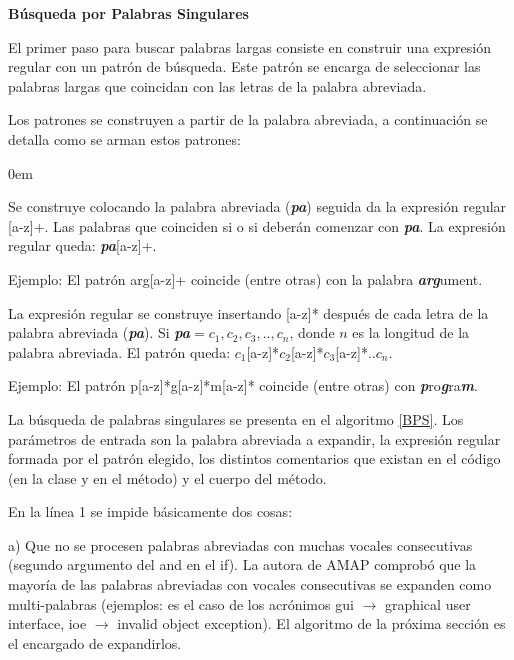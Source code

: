 \documentclass[a4paper,12pt]{report}
\begin{document}
\noindent \textbf{Búsqueda por Palabras Singulares\\}

El primer paso para buscar palabras largas consiste en construir una expresión regular con un patrón de búsqueda.  Este patrón se encarga de seleccionar las palabras largas que coincidan con las letras de la palabra abreviada.

Los patrones se construyen a partir de la palabra abreviada, a continuación se detalla como se arman estos patrones: 

\begin{description}
\itemsep0em%
\item[Patrón prefijo:] Se construye colocando la palabra abreviada (\textit{\textbf{pa}}) seguida da la expresión regular [a-z]+. Las palabras que coinciden si o si deberán comenzar con \textit{\textbf{pa}}. La expresión regular queda: \textit{\textbf{pa}}[a-z]+.

Ejemplo: El patrón \textsf{arg}[a-z]+ coincide (entre otras) con la palabra \textit{\textbf{arg}}ument.

\item[Patrón compuesto por letras:]  La expresión regular se construye insertando [a-z]* después de cada letra de la palabra abreviada (\textit{\textbf{pa}}). Si \textit{\textbf{pa}}$=c_{1},c_{2},c_{3},..,c_{n}$, donde $n$ es la longitud de la palabra abreviada. El patrón queda: $c_{1}$[a-z]*$c_{2}$[a-z]*$c_{3}$[a-z]*..$c_{n}$.

Ejemplo: El patrón \textsf{p}[a-z]*\textsf{g}[a-z]*\textsf{m}[a-z]* coincide (entre otras) con  \textit{\textbf{p}}ro\textit{\textbf{g}}ra\textit{\textbf{m}}.
\end{description}



La búsqueda de palabras singulares se presenta en el algoritmo \ref{BPS}. Los parámetros de entrada son la palabra abreviada a expandir, la expresión regular formada por el patrón elegido, los distintos comentarios que existan en el código (en la clase y en el método) y el cuerpo del método.

En la línea 1 se impide básicamente dos cosas: 

a) Que no se procesen palabras abreviadas con muchas vocales consecutivas (segundo argumento del \textsf{and} en el \textsf{if}). La autora de AMAP comprobó \cite{EZH08} que la mayoría de las palabras abreviadas con vocales consecutivas se expanden como multi-palabras (ejemplos: es el caso de los acrónimos \textsf{gui} $\rightarrow$ \textsf{graphical user interface}, \textsf{ioe} $\rightarrow$ \textsf{invalid object exception}). El algoritmo de la próxima sección es el encargado de expandirlos.
\end{document}
